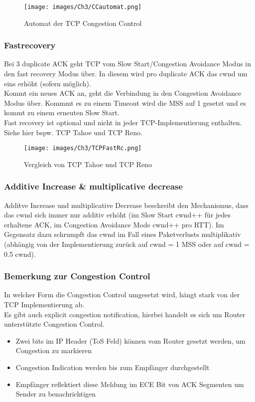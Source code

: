 \begin{figure}[H]
    \centering
    \texttt{[image: images/Ch3/CCautomat.png]}
    \caption{Automat der TCP Congestion Control}
    \label{Ch03-TCP-CCautomat}
\end{figure}

\subsubsection{Fastrecovery}
Bei 3 duplicate ACK geht TCP vom Slow Start/Congestion Avoidance Modus in den fast recovery Modus über. In diesem wird pro duplicate ACK das cwnd um eins erhöht (sofern möglich).\\
Kommt ein neues ACK an, geht die Verbindung in den Congestion Avoidance Modus über. Kommmt es zu einem Timeout wird die MSS auf 1 gesetzt und es kommt zu einem erneuten Slow Start.\\
\hfill \break
Fast recovery ist optional und nicht in jeder TCP-Implementierung enthalten. Siehe hier bspw. TCP Tahoe und TCP Reno.\\


\begin{figure}[H]
    \centering
    \texttt{[image: images/Ch3/TCPFastRc.png]}
    \caption{Vergleich von TCP Tahoe und TCP Reno}
    \label{Ch03-TCP-TahoeReno}
\end{figure}

\subsubsection{Additive Increase \& multiplicative decrease}
Additve Increase und multiplicative Decrease beschreibt den Mechanismus, dass das cwnd sich immer nur additiv erhöht (im Slow Start cwnd++ für jedes erhaltene ACK, im Congestion Avoidance Mode cwnd++ pro RTT).
Im Gegensatz dazu schrumpft das cwnd im Fall eines Paketverlusts multiplikativ (abhängig von der Implementierung zurück auf cwnd = 1 MSS oder auf cwnd = 0.5 cwnd).

\subsubsection{Bemerkung zur Congestion Control}
In welcher Form die Congestion Control umgesetzt wird, hängt stark von der TCP Implementierung ab. \\
\noindent Es gibt auch explicit congestion notification, hierbei handelt es sich um Router unterstützte Congestion Control.
\begin{itemize}
    \item Zwei bits im IP Header (ToS Feld) können vom Router gesetzt werden, um Congestion zu markieren
    \item Congestion Indication werden bis zum Empfänger durchgestellt
    \item Empfänger reflektiert diese Meldung im ECE Bit von ACK Segmenten um Sender zu benachrichtigen
\end{itemize}

